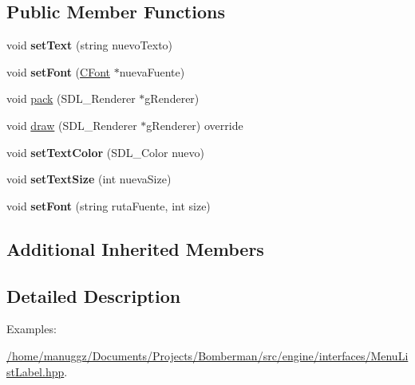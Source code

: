 \subsection*{Public Member Functions}
\begin{DoxyCompactItemize}
\item 
void {\bfseries set\+Text} (string nuevo\+Texto)\hypertarget{class_label_component_a0ed2e841847a3fcd745097a6daee50ba}{}\label{class_label_component_a0ed2e841847a3fcd745097a6daee50ba}

\item 
void {\bfseries set\+Font} (\hyperlink{class_c_font}{C\+Font} $\ast$nueva\+Fuente)\hypertarget{class_label_component_a1fc48a3b8c8807d73688c57442c8d2c1}{}\label{class_label_component_a1fc48a3b8c8807d73688c57442c8d2c1}

\item 
void \hyperlink{class_label_component_a9979a17ac60f351d9850e0d670d8ab0e}{pack} (S\+D\+L\+\_\+\+Renderer $\ast$g\+Renderer)
\item 
void \hyperlink{class_label_component_a9637b7af88eb351108ef490f175b39a9}{draw} (S\+D\+L\+\_\+\+Renderer $\ast$g\+Renderer) override
\item 
void {\bfseries set\+Text\+Color} (S\+D\+L\+\_\+\+Color nuevo)\hypertarget{class_label_component_aecb3f36a01c1c4f5bc924d8f4041bfc9}{}\label{class_label_component_aecb3f36a01c1c4f5bc924d8f4041bfc9}

\item 
void {\bfseries set\+Text\+Size} (int nueva\+Size)\hypertarget{class_label_component_a74dca5480528e2748a20368e909ebdf8}{}\label{class_label_component_a74dca5480528e2748a20368e909ebdf8}

\item 
void {\bfseries set\+Font} (string ruta\+Fuente, int size)\hypertarget{class_label_component_a436f611099bc24618624fca6b4a6de3a}{}\label{class_label_component_a436f611099bc24618624fca6b4a6de3a}

\end{DoxyCompactItemize}
\subsection*{Additional Inherited Members}


\subsection{Detailed Description}
\begin{Desc}
\item[Examples\+: ]\par
\hyperlink{_2home_2manuggz_2_documents_2_projects_2_bomberman_2src_2engine_2interfaces_2_menu_list_label_8hpp-example}{/home/manuggz/\+Documents/\+Projects/\+Bomberman/src/engine/interfaces/\+Menu\+List\+Label.\+hpp}.\end{Desc}


